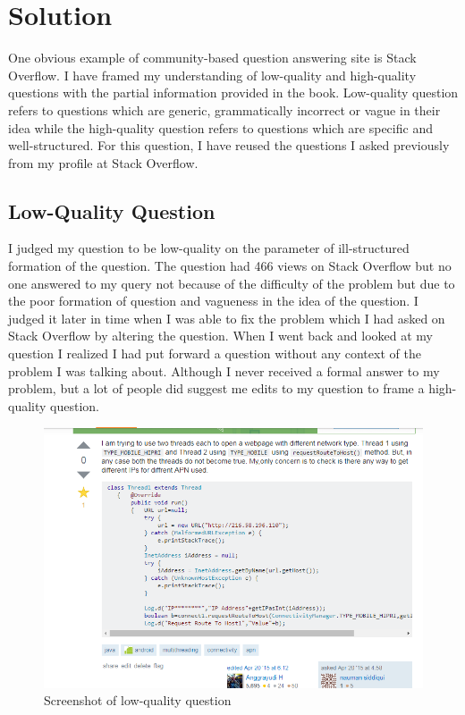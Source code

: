 \documentclass[12pt]{report}
\begin{document}
\section{Solution}
One obvious example of community-based question answering site is Stack Overflow. I have framed my understanding of low-quality and high-quality questions with the partial information provided in the book. Low-quality question refers to questions which are generic, grammatically incorrect or vague in their idea while the high-quality question refers to questions which are specific and well-structured. For this question, I have reused the questions I asked previously from my profile at Stack Overflow.
\subsection{Low-Quality Question}
I judged my question to be low-quality on the parameter of ill-structured formation of the question. The question had 466 views on Stack Overflow but no one answered to my query not because of the difficulty of the problem but due to the poor formation of question and vagueness in the idea of the question. I judged it later in time when I was able to fix the problem which I had asked on Stack Overflow by altering the question. When I went back and looked at my question I realized I had put forward a question without any context of the problem I was talking about. Although I never received a formal answer to my problem, but a lot of people did suggest me edits to my question to frame a high-quality question. 

\begin{figure}[ht]
  \centering
  \includegraphics[width=1\textwidth]{Problem10_5/LowQuality.png}
  \caption{Screenshot of low-quality question}
  \label{fig:1}
\end{figure} 
\end{document}
